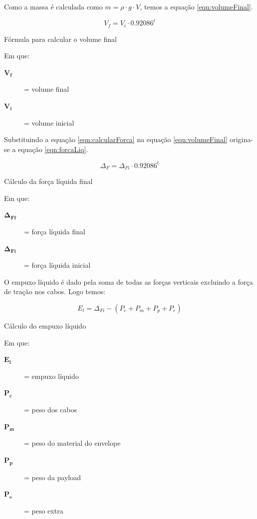 	Como a massa é calculada como $m = \rho \cdot g \cdot V $, temos a equação \eqref{eqn:volumeFinal}.

	\begin{equacao}
		\begin{equation}
			V_f = V_i \cdot 0.92086^t
		\end{equation}
		\caption{Fórmula para calcular o volume final}
		\label{eqn:volumeFinal}
	\end{equacao}

	Em que:
	\begin{description}
		\item[$\boldsymbol{V_f}$] = volume final
		\item[$\boldsymbol{V_i}$] = volume inicial
	\end{description}

	Substituindo a equação \eqref{eqn:calcularForca} na	equação \eqref{eqn:volumeFinal} origina-se a equação \eqref{eqn:forcaLiq}.

	\begin{equacao}
		\begin{equation}
			\Delta_F = \Delta_{Fi} \cdot 0.92086^t
		\end{equation}
		\caption{Cálculo da força líquida final}
		\label{eqn:forcaLiq}
	\end{equacao}

	Em que:
	\begin{description}
		\item[$\boldsymbol{\Delta_{Ff}}$] = força líquida final
		\item[$\boldsymbol{\Delta_{Fi}}$] = força líquida inicial
	\end{description}

	O empuxo líquido é dado pela soma de todas as forças verticais excluindo a força de tração nos cabos. Logo temos:

	\begin{equacao}
		\begin{equation}
			E_l = \Delta_{Fi} - (P_c + P_m + P_p + P_e)
		\end{equation}
		\caption{Cálculo do empuxo líquido}
		\label{eqn:empuxoLiq}
	\end{equacao}

	Em que:
	\begin{description}
		\item[$\boldsymbol{E_l}$] = empuxo líquido
		\item[$\boldsymbol{P_c}$] = peso dos cabos
		\item[$\boldsymbol{P_m}$] = peso do material do envelope
		\item[$\boldsymbol{P_p}$] = peso da payload
		\item[$\boldsymbol{P_e}$] = peso extra
	\end{description}

